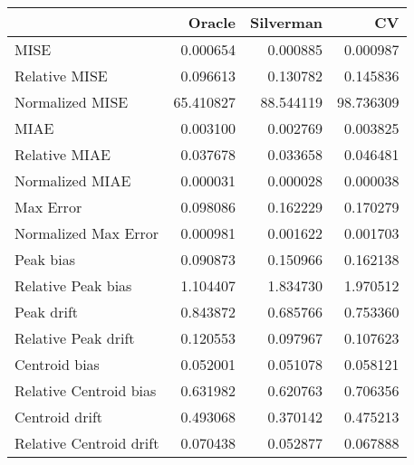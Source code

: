 \begin{tabular}{lrrr}
  \hline
 & Oracle & Silverman & CV \\ 
  \hline
MISE & 0.000654 & 0.000885 & 0.000987 \\ 
  Relative MISE & 0.096613 & 0.130782 & 0.145836 \\ 
  Normalized MISE & 65.410827 & 88.544119 & 98.736309 \\ 
  MIAE & 0.003100 & 0.002769 & 0.003825 \\ 
  Relative MIAE & 0.037678 & 0.033658 & 0.046481 \\ 
  Normalized MIAE & 0.000031 & 0.000028 & 0.000038 \\ 
  Max Error & 0.098086 & 0.162229 & 0.170279 \\ 
  Normalized Max Error & 0.000981 & 0.001622 & 0.001703 \\ 
  Peak bias & 0.090873 & 0.150966 & 0.162138 \\ 
  Relative Peak bias & 1.104407 & 1.834730 & 1.970512 \\ 
  Peak drift & 0.843872 & 0.685766 & 0.753360 \\ 
  Relative Peak drift & 0.120553 & 0.097967 & 0.107623 \\ 
  Centroid bias & 0.052001 & 0.051078 & 0.058121 \\ 
  Relative Centroid bias & 0.631982 & 0.620763 & 0.706356 \\ 
  Centroid drift & 0.493068 & 0.370142 & 0.475213 \\ 
  Relative Centroid drift & 0.070438 & 0.052877 & 0.067888 \\ 
   \hline
\end{tabular}
